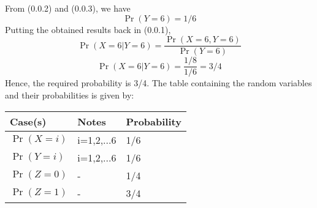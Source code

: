 \documentclass[journal,12pt,twocolumn]{IEEEtran}
\begin{document}
\newline From (0.0.2) and (0.0.3), we have 
$$ \Pr(Y=6) = 1/6 $$
Putting the obtained results back in (0.0.1),
$$\Pr(X=6|Y=6) = \frac{\Pr(X=6, Y=6)}{\Pr(Y=6)} $$
$$\Pr(X=6|Y=6) = \frac{1/8}{1/6} = 3/4$$
Hence, the required probability is 3/4.
\newline \newline The table containing the random variables and their probabilities is given by:
\begin{center}
\begin{tabular}{ |m{1.75cm}| m{1.75cm}| m{2cm} | } 
\hline
Case(s) & Notes & Probability\\ 
\hline
$\Pr(X=i)$ & i=1,2,...6 & 1/6 \\ 
\hline
$\Pr(Y=i)$ & i=1,2,...6 & 1/6 \\ 
\hline
$\Pr(Z=0)$ & - & 1/4 \\ 
\hline 
$\Pr(Z=1)$ & - & 3/4 \\ 
\hline
\end{tabular}
\end{center}
\end{document}
